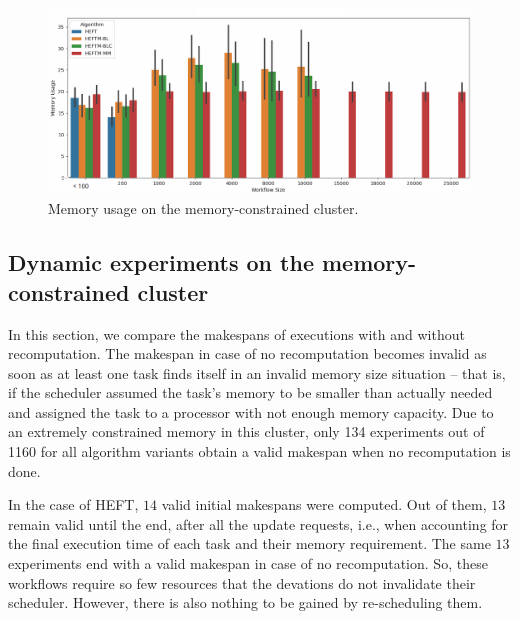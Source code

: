 \documentclass[conference]{IEEEtran}
\newcommand{\algo}[1]{\textsc{#1}}
\newcommand{\heft}{\algo{HEFT}\xspace}
\newcommand{\new}[1]{{\color{blue}#1}}
\begin{document}
\begin{figure}[tb]
    \centering
    \includegraphics[width=1\columnwidth] {images/mem-usage-constrained-onlyvalid2}
    \caption{Memory usage on the memory-constrained  cluster. } %
    \label{fig:memory-usage-constrained}
\end{figure}


    
\subsection{Dynamic experiments on the memory-constrained cluster}
\label{sec.expe.dyn}
\new{In this section, we compare the makespans of executions with and without recomputation.}
The makespan in case of no recomputation becomes invalid as soon as at least one task finds itself in an invalid memory size
situation -- that is, if the scheduler assumed the task's memory to be smaller than actually needed and
assigned the task to a processor with not enough memory capacity.
Due to an extremely constrained memory in this cluster, only 134 experiments out of 1160 
for all algorithm variants \new{obtain a valid makespan when no recomputation is done}.

In the case of \heft, $14$ valid initial makespans were computed.
Out of them, $13$ remain valid until the end, after all the update requests,
\new{i.e., when accounting for the final execution time of each task and their memory requirement.}
The same $13$ experiments end with a valid makespan in case of no recomputation.
So, these workflows require so few resources that
\new{the devations do not invalidate their scheduler. However, there is also nothing to be gained by re-scheduling them.}
\end{document}

